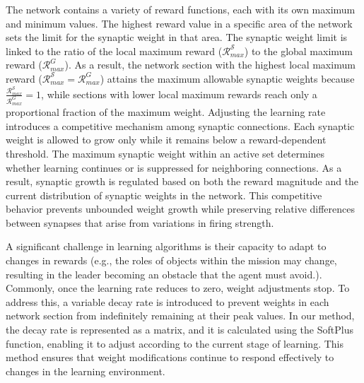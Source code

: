The network contains a variety of reward functions, each with its own maximum and minimum values. The highest reward value in a specific area of the network sets the limit for the synaptic weight in that area. The synaptic weight limit is linked to the ratio of the local maximum reward (\(\mathcal{R}_{max}^{\mathcal{S}}\)) to the global maximum reward (\(\mathcal{R}_{max}^{G}\)). As a result, the network section with the highest local maximum reward (\(\mathcal{R}_{max}^{\mathcal{S}}=\mathcal{R}_{max}^{G}\)) attains the maximum allowable synaptic weights because \(\frac{\mathcal{R}_{max}^{\mathcal{S}}}{\mathcal{R}_{max}^{G}}=1\), while sections with lower local maximum rewards reach only a proportional fraction of the maximum weight. Adjusting the learning rate introduces a competitive mechanism among synaptic connections. Each synaptic weight is allowed to grow only while it remains below a reward-dependent threshold. The maximum synaptic weight within an active set determines whether learning continues or is suppressed for neighboring connections. As a result, synaptic growth is regulated based on both the reward magnitude and the current distribution of synaptic weights in the network. This competitive behavior prevents unbounded weight growth while preserving relative differences between synapses that arise from variations in firing strength.

A significant challenge in learning algorithms is their capacity to adapt to changes in rewards (e.g., the roles of objects within the mission may change, resulting in the leader becoming an obstacle that the agent must avoid.). Commonly, once the learning rate reduces to zero, weight adjustments stop. To address this, a variable decay rate is introduced to prevent weights in each network section from indefinitely remaining at their peak values. In our method, the decay rate is represented as a matrix, and it is calculated using the SoftPlus function, enabling it to adjust according to the current stage of learning. This method ensures that weight modifications continue to respond effectively to changes in the learning environment.

